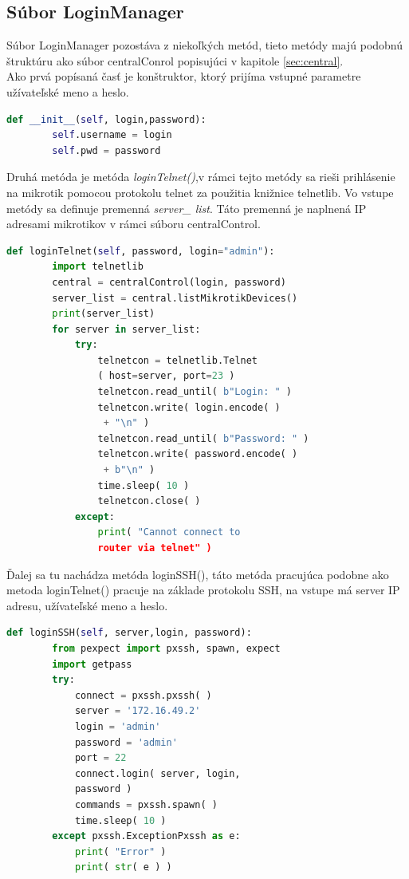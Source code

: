 \subsection{Súbor LoginManager}
Súbor LoginManager pozostáva z niekoľkých metód, tieto metódy majú podobnú štruktúru ako súbor centralConrol popisujúci v kapitole \ref{sec:central}.\\
Ako prvá popísaná časť je konštruktor, ktorý prijíma vstupné parametre užívateľské meno a heslo.
\begin{lstlisting}[language=python, frame=single, caption=Konštruktor súboru,captionpos=b, showstringspaces=false] 
def __init__(self, login,password):
        self.username = login
        self.pwd = password
\end{lstlisting}
Druhá metóda je metóda \textit{loginTelnet()},v rámci tejto metódy sa rieši prihlásenie na mikrotik pomocou protokolu telnet za použitia knižnice telnetlib. Vo vstupe metódy sa definuje premenná \textit{server\_ list}. Táto premenná je naplnená IP adresami mikrotikov v rámci súboru centralControl.
\begin{lstlisting}[language=python, frame=single, caption=Metóda loginTelnet,captionpos=b, showstringspaces=false] 
def loginTelnet(self, password, login="admin"):
        import telnetlib
        central = centralControl(login, password)
        server_list = central.listMikrotikDevices()
        print(server_list)
        for server in server_list:
            try:
                telnetcon = telnetlib.Telnet
                ( host=server, port=23 )
                telnetcon.read_until( b"Login: " )
                telnetcon.write( login.encode( )
                 + "\n" )
                telnetcon.read_until( b"Password: " )
                telnetcon.write( password.encode( )
                 + b"\n" )
                time.sleep( 10 )
                telnetcon.close( )
            except:
                print( "Cannot connect to 
                router via telnet" )
\end{lstlisting}
\newpage
Ďalej sa tu nachádza metóda loginSSH(), táto metóda pracujúca podobne ako metoda loginTelnet() pracuje na základe protokolu SSH, na vstupe má server IP adresu, užívateľské meno  a heslo.
\begin{lstlisting}[language=python, frame=single, caption=Metóda loginSSH,captionpos=b, showstringspaces=false] 
def loginSSH(self, server,login, password):
        from pexpect import pxssh, spawn, expect
        import getpass
        try:
            connect = pxssh.pxssh( )
            server = '172.16.49.2'
            login = 'admin'
            password = 'admin'
            port = 22
            connect.login( server, login, 
            password )
            commands = pxssh.spawn( )
            time.sleep( 10 )
        except pxssh.ExceptionPxssh as e:
            print( "Error" )
            print( str( e ) )
\end{lstlisting}
